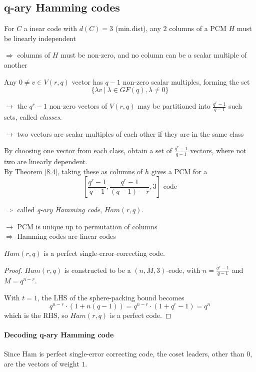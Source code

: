 \documentclass{article}
\theoremstyle{definition}
\newenvironment{thm}[1]
{\renewcommand\theinnerthm{#1}\innerthm}
{\endinnerthm}
\begin{document}
\subsection{q-ary Hamming codes}
For $C$ a inear code with $d(C)=3$ (min.dist), any $2$ columns of a PCM $H$ must be linearly independent

$\Longrightarrow$ columns of $H$ must be non-zero, and no column can be a scalar multiple of another

Any $0 \neq v \in V(r,q)$ vector has $q-1$ non-zero scalar multiples, forming the set
$$\{ \lambda v ~|~ \lambda \in GF(q), \lambda \neq 0 \}$$

$\longrightarrow$ the $q^r -1$ non-zero vectors of $V(r,q)$ may be partitioned into $\frac{q^r-1}{q-1}$ such sets, called \emph{classes}.

$\longrightarrow$ two vectors are scalar multiples of each other if they are in the same class

By choosing one vector from each class, obtain a set of $\frac{q^r-1}{q-1}$ vectors, where not two are linearly dependent.\\
\hspace*{2em} By Theorem \ref{8.4}, taking these as columns of $h$ gives a PCM for a
$$\left[\frac{q^r-1}{q-1}, \frac{q^r-1}{(q-1)-r}, 3 \right] \text{-code}$$

\hspace*{2em} $\Longrightarrow$ called \emph{q-ary Hamming code}, $Ham(r, q)$.

$\longrightarrow$ PCM is unique up to permutation of columns\\
\hspace*{2em}$\Longrightarrow$ Hamming codes are linear codes


\vspace{0.5cm}

\begin{thm}{8.6}
  $Ham(r, q)$ is a perfect single-error-correcting code.
\end{thm}
\begin{proof}
  $Ham(r, q)$ is constructed to be a $(n, M, 3)$-code, with $n=\frac{q^r-1}{q-1}$ and $M=q^{n-r}$.

  With $t=1$, the LHS of the sphere-packing bound becomes
  $$q^{n-r} \cdot (1 + n(q-1)) = q^{n-r} \cdot (1 + q^r -1) = q^n$$
  which is the RHS, so $Ham(r, q)$ is a perfect code.
\end{proof}

\paragraph{Decoding q-ary Hamming code}
Since Ham is perfect single-error correcting code, the coset leaders, other than $0$, are the vectors of weight $1$.
\end{document}

